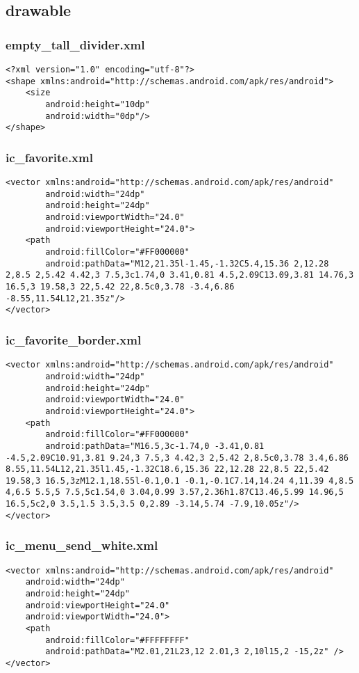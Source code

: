 \subsection{drawable}
\subsubsection{empty\_tall\_divider.xml}
\begin{lstlisting}
<?xml version="1.0" encoding="utf-8"?>
<shape xmlns:android="http://schemas.android.com/apk/res/android">
    <size
        android:height="10dp"
        android:width="0dp"/>
</shape>
\end{lstlisting}

\subsubsection{ic\_favorite.xml}
\begin{lstlisting}
<vector xmlns:android="http://schemas.android.com/apk/res/android"
        android:width="24dp"
        android:height="24dp"
        android:viewportWidth="24.0"
        android:viewportHeight="24.0">
    <path
        android:fillColor="#FF000000"
        android:pathData="M12,21.35l-1.45,-1.32C5.4,15.36 2,12.28 2,8.5 2,5.42 4.42,3 7.5,3c1.74,0 3.41,0.81 4.5,2.09C13.09,3.81 14.76,3 16.5,3 19.58,3 22,5.42 22,8.5c0,3.78 -3.4,6.86 -8.55,11.54L12,21.35z"/>
</vector>
\end{lstlisting}

\subsubsection{ic\_favorite\_border.xml}
\begin{lstlisting}
<vector xmlns:android="http://schemas.android.com/apk/res/android"
        android:width="24dp"
        android:height="24dp"
        android:viewportWidth="24.0"
        android:viewportHeight="24.0">
    <path
        android:fillColor="#FF000000"
        android:pathData="M16.5,3c-1.74,0 -3.41,0.81 -4.5,2.09C10.91,3.81 9.24,3 7.5,3 4.42,3 2,5.42 2,8.5c0,3.78 3.4,6.86 8.55,11.54L12,21.35l1.45,-1.32C18.6,15.36 22,12.28 22,8.5 22,5.42 19.58,3 16.5,3zM12.1,18.55l-0.1,0.1 -0.1,-0.1C7.14,14.24 4,11.39 4,8.5 4,6.5 5.5,5 7.5,5c1.54,0 3.04,0.99 3.57,2.36h1.87C13.46,5.99 14.96,5 16.5,5c2,0 3.5,1.5 3.5,3.5 0,2.89 -3.14,5.74 -7.9,10.05z"/>
</vector>
\end{lstlisting}

\subsubsection{ic\_menu\_send\_white.xml}
\begin{lstlisting}
<vector xmlns:android="http://schemas.android.com/apk/res/android"
    android:width="24dp"
    android:height="24dp"
    android:viewportHeight="24.0"
    android:viewportWidth="24.0">
    <path
        android:fillColor="#FFFFFFFF"
        android:pathData="M2.01,21L23,12 2.01,3 2,10l15,2 -15,2z" />
</vector>
\end{lstlisting}

